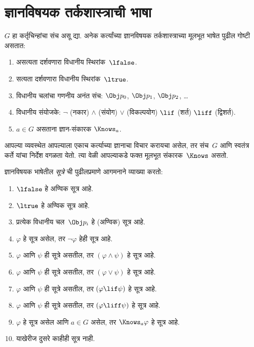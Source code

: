 \section{ज्ञानविषयक तर्कशास्त्राची भाषा}\label{aml:el:lan:sec}
\begin{defn}
$G$ हा कर्तृचिन्हांचा संच असू द्या. अनेक कर्त्यांच्या
ज्ञानविषयक तर्कशास्त्राच्या मूलभूत भाषेत पुढील गोष्टी
असतात:
\begin{enumerate}
  \item असत्यता दर्शवणारा विधानीय स्थिरांक~$\lfalse$.
  \item सत्यता दर्शवणारा विधानीय स्थिरांक~$\ltrue$.
  \item विधानीय चलांचा गणनीय अनंत संच: $\Obj
    p_0$, $\Obj p_1$, $\Obj p_2$, \dots
  \item विधानीय संयोजके: \startycommalist
  \ycomma $\lnot$ (नकार)
  \ycomma $\land$ (संयोग)
  \ycomma $\lor$ (विकल्पयोग)
  \ycomma $\lif$ (शर्त)
  \ycomma $\liff$ (द्विशर्त).
  \item $a \in G$ असताना ज्ञान-संकारक $\Knows_a$.
\end{enumerate}
\end{defn}
आपल्या व्यवस्थेत आपल्याला एकाच कर्त्याच्या ज्ञानाचा
विचार करायचा असेल, तर संच~$G$ आणि स्वतंत्र कर्ते
यांचा निर्देश वगळता येतो. त्या वेळी आपल्याकडे फक्त
मूलभूत संकारक~$\Knows$ असतो.
\begin{defn}
ज्ञानविषयक भाषेतील \emph{सूत्रे} ची पुढीलप्रमाणे
  आगमनाने व्याख्या करतो:
\begin{enumerate}
\item $\lfalse$ हे अण्विक सूत्र आहे.
\item $\ltrue$ हे अण्विक सूत्र आहे.
\item प्रत्येक विधानीय चल~$\Obj p_i$ हे (अण्विक) सूत्र आहे.
\item $\varphi$ हे सूत्र असेल, तर $\lnot \varphi$
  हेही सूत्र आहे.
\item $\varphi$ आणि $\psi$ ही सूत्रे असतील, तर $(\varphi \land
  \psi)$ हे सूत्र आहे.
\item $\varphi$ आणि $\psi$ ही सूत्रे असतील, तर $(\varphi \lor \psi)$
  हे सूत्र आहे.
\item $\varphi$ आणि $\psi$ ही सूत्रे असतील, तर $(\varphi \lif \psi)$
  हे सूत्र आहे.
\item $\varphi$ आणि $\psi$ ही सूत्रे असतील, तर $(\varphi \liff \psi)$
  हे सूत्र आहे.
\item $\varphi$ हे सूत्र असेल आणि $a \in G$ असेल,
  तर $\Knows_a \varphi$ हे सूत्र आहे.
\item याखेरीज दुसरे काहीही सूत्र नाही.
\end{enumerate}
\end{defn}
